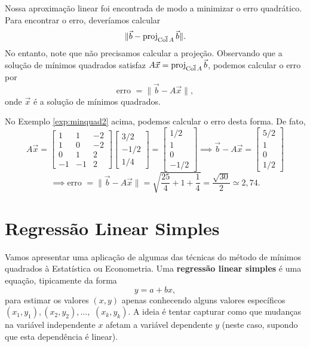 \documentclass[../livro.tex]{subfiles}  %
\begin{document}
Nossa aproximação linear foi encontrada de modo a minimizar o erro quadrático. Para encontrar o erro, deveríamos calcular
\begin{equation}
\| \vec{b} - \operatorname{proj}_{\vec{\operatorname{Col} A}} \vec{b} \|.
\end{equation} No entanto, note que não precisamos calcular a projeção. Observando que a solução de mínimos quadrados satisfaz $A \vec{x} = \operatorname{proj}_{\vec{\operatorname{Col} A}} \vec{b}$, podemos calcular o erro por
\begin{equation}
\text{erro } = \| \vec{b} - A \vec{x} \|,
\end{equation} onde $\vec{x}$ é a solução de mínimos quadrados.

No Exemplo \ref{exp:minquad2} acima, podemos calcular o erro desta forma. De fato,
\begin{equation}
A \vec{x} = 
\begin{bmatrix}
  1 & 1 & -2 \\ 
  1 & 0 & -2 \\ 
  0 & 1 &  2 \\ 
  -1 & -1&  2
\end{bmatrix}
\begin{bmatrix}
  3/2 \\ -1/2 \\ 1/4
\end{bmatrix} = 
\begin{bmatrix}
  1/2 \\ 1 \\ 0 \\ -1/2
\end{bmatrix} \implies 
\vec{b} - A\vec{x} = 
\begin{bmatrix}
  5/2 \\ 1 \\ 0 \\ 1/2
\end{bmatrix}
\end{equation}
\begin{equation}
\implies \text{erro } = \| \vec{b} - A \vec{x} \| = \sqrt{\frac{25}{4} + 1 + \frac{1}{4}} = \frac{\sqrt{30}}{2} \simeq 2,74.
\end{equation}





\section{Regressão Linear Simples}

Vamos apresentar uma aplicação de algumas das técnicas do método de mínimos quadrados à Estatística ou Econometria. Uma \textbf{regressão linear simples} é uma equação, tipicamente da forma
\begin{equation}
y = a + b x,
\end{equation} para estimar os valores $(x,y)$ apenas conhecendo alguns valores específicos $(x_1, y_1), (x_2, y_2), \dots,$ $(x_k, y_k)$. A ideia é tentar capturar como que mudanças na variável independente $x$ afetam a variável dependente $y$ (neste caso, supondo que esta dependência é linear).
\end{document}
